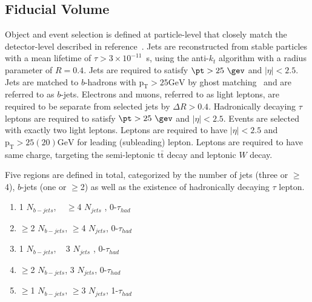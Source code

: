 
\subsection{Fiducial Volume}
Object and event selection is defined at particle-level that closely match the detector-level described in reference~\cite{HIGG-2017-02}. 
Jets are reconstructed from stable particles with a mean lifetime of $\tau > 3\times 10^{-11}$~s, using the anti-$k_t$ algorithm with a radius parameter of $R=0.4$.
Jets are required to satisfy $\pt > 25~\gev$ and $|\eta| < 2.5$.
Jets are matched to $b$-hadrons with $\mathrm{p_{T}>25 GeV}$ by ghost matching~\cite{70ttbb} and are referred to as $b$-jets. 
Electrons and muons, referred to as light leptons, are required to be separate from selected jets by $\Delta R>0.4$. 
Hadronically decaying $\tau$ leptons are required to satisfy $\pt > 25~\gev$ and $|\eta| < 2.5$.
Events are selected with exactly two light leptons.
Leptons are required to have $|\eta|< 2.5$ and $\mathrm{p_{T}>25(20) GeV}$ for leading (subleading) lepton. 
Leptons are required to have same charge, targeting the semi-leptonic $\mathrm{t\bar{t}}$ decay and leptonic $W$ decay.

 
Five regions are defined in total, categorized by the number of jets (three or  $\geq$4), $b$-jets (one or $\geq$2) as well as the existence of hadronically decaying $\tau$ lepton. 
				\begin{enumerate}
				\item  1 $N_{b-jets}$, ~ $\geq$4 $N_{jets}$ , 0-$\tau_{had}$
				\item  $\geq$2 $N_{b-jets}$,   $\geq$4 $N_{jets}$, 0-$\tau_{had}$
				\item  1 $N_{b-jets}$, ~  3 $N_{jets}$ , 0-$\tau_{had}$
				\item  $\geq$2 $N_{b-jets}$, 3 $N_{jets}$, 0-$\tau_{had}$
				\item $\geq$1 $N_{b-jets}$, $\geq$3 $N_{jets}$, 1-$\tau_{had}$
				\end{enumerate}


